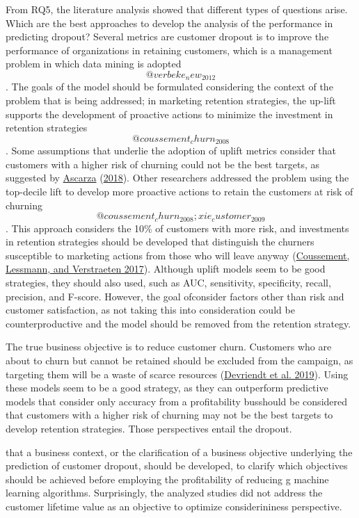 \documentclass[
  12pt,
]{article}
\begin{document}
From RQ5, the literature analysis showed that different types of questions
arise. Which are the best approaches to develop the analysis of the performance
in predicting dropout? Several metrics are customer dropout is to improve the
performance of organizations in retaining customers, which is a management
problem in which data mining is adopted \[@verbeke_new_2012\]. The goals of the
model should be formulated considering the context of the problem that is being
addressed; in marketing retention strategies, the up-lift supports the
development of proactive actions to minimize the investment in retention
strategies \[@coussement_churn_2008\]. Some assumptions that underlie the
adoption of uplift metrics consider that customers with a higher risk of
churning could not be the best targets, as suggested by \protect\hyperlink{ref-ascarza_retention_2018}{Ascarza} (\protect\hyperlink{ref-ascarza_retention_2018}{2018}).
Other researchers addressed the problem using the top-decile lift to develop
more proactive actions to retain the customers at risk of churning
\[@coussement_churn_2008;xie_customer_2009\]. This approach considers the 10\% of
customers with more risk, and investments in retention strategies should be
developed that distinguish the churners susceptible to marketing actions from
those who will leave anyway (\protect\hyperlink{ref-coussement_comparative_2017}{Coussement, Lessmann, and Verstraeten 2017}). Although uplift
models seem to be good strategies, they should also used, such as AUC,
sensitivity, specificity, recall, precision, and F-score. However, the goal
ofconsider factors other than risk and customer satisfaction, as not taking this
into consideration could be counterproductive and the model should be removed
from the retention strategy.

The true business objective is to reduce customer churn. Customers who are about
to churn but cannot be retained should be excluded from the campaign, as
targeting them will be a waste of scarce resources (\protect\hyperlink{ref-devriendt_why_2019}{Devriendt et al. 2019}). Using
these models seem to be a good strategy, as they can outperform predictive
models that consider only accuracy from a profitability busshould be considered
that customers with a higher risk of churning may not be the best targets to
develop retention strategies. Those perspectives entail the dropout.

that a business context, or the clarification of a business objective underlying
the prediction of customer dropout, should be developed, to clarify which
objectives should be achieved before employing the profitability of reducing g
machine learning algorithms. Surprisingly, the analyzed studies did not address
the customer lifetime value as an objective to optimize considerininess
perspective.
\end{document}
